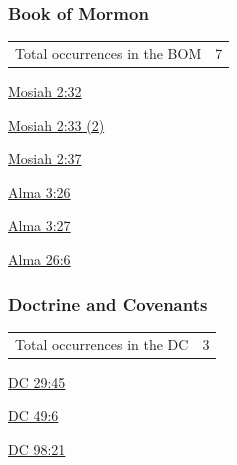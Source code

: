 	\subsubsection{Book of Mormon} %
		\label{LIST-BOM}
	
		\begin{tabular}{ll}
			Total occurrences in the BOM & 7
		\end{tabular}
		
		\begin{compactdesc}
			\item[{\hyperref[MOSIAH-2-32]{Mosiah 2:32}}]
			\item[{\hyperref[MOSIAH-2-33]{Mosiah 2:33 (2)}}]
			\item[{\hyperref[MOSIAH-2-37]{Mosiah 2:37}}]
			\item[{\hyperref[ALMA-3-26]{Alma 3:26}}]
			\item[{\hyperref[ALMA-3-27]{Alma 3:27}}]
			\item[{\hyperref[ALMA-26-6]{Alma 26:6}}]
		\end{compactdesc}
		
	\subsubsection{Doctrine and Covenants} %
		\label{LIST-DC}
	
		\begin{tabular}{ll}
			Total occurrences in the DC & 3
		\end{tabular}
		
		\begin{compactdesc}
			\item[{\hyperref[DC29-45]{DC 29:45}}]
			\item[{\hyperref[DC49-6]{DC 49:6}}]
			\item[{\hyperref[DC98-21]{DC 98:21}}]
		\end{compactdesc}
		
	
		
		
